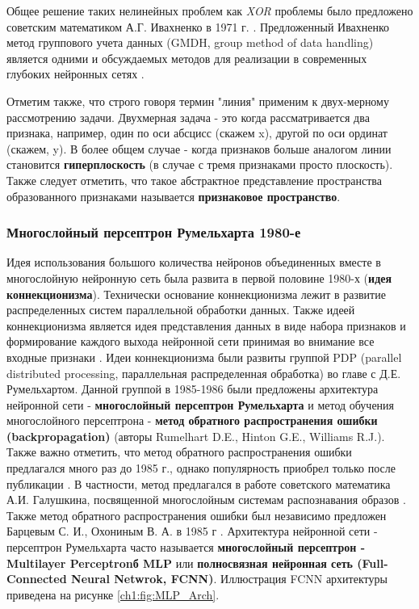 \documentclass[12pt]{article}
\begin{document}
\begin{sloppypar}
Общее решение таких нелинейных проблем как \emph{XOR} проблемы было предложено советским математиком А.Г. Ивахненко в 1971 г. 
\cite{ivakhnenko1971polynomial}. 
 Предложенный Ивахненко метод группового учета данных (GMDH, group method of data handling) является одними и обсуждаемых методов для реализации в современных глубоких нейронных сетях
\cite{schmidhuber2015deep, kelleher2019deep}. 

Отметим также, что строго говоря термин "линия" применим к двух-мерному рассмотрению задачи. 
Двухмерная задача - это когда рассматривается два признака, например, один по оси абсцисс (скажем x), другой по оси ординат (скажем, y). В более общем случае - когда признаков больше аналогом линии становится \textbf{гиперплоскость} (в случае с тремя признаками просто плоскость). Также следует отметить, что такое абстрактное представление пространства образованного признаками называется  \textbf{признаковое пространство}. 

\subsubsection{ Многослойный персептрон Румельхарта 1980-е}

Идея использования большого количества нейронов объединенных вместе в многослойную нейронную сеть была развита в первой половине 1980-х (\textbf{идея коннекционизма}). Технически основание коннекционизма лежит в развитие распределенных систем параллельной обработки данных. Также идеей коннекционизма является идея представления данных в виде набора признаков и формирование каждого выхода нейронной сети принимая во внимание все входные признаки 
\cite{goodfellow2016deep}. 
Идеи коннекционизма были развиты группой 
PDP (parallel distributed processing, параллельная распределенная обработка) во главе с Д.Е. Румельхартом. Данной группой в 1985-1986 были предложены архитектура нейронной сети - \textbf{многослойный персептрон  Румельхарта}
\cite{rummelhart1986parallel}
и метод обучения многослойного персептрона -\textbf{ метод обратного распространения ошибки (backpropagation)} 
\cite{rumelhart1985learning} (авторы Rumelhart D.E., Hinton G.E., Williams R.J.). Также важно отметить, что метод обратного распространения ошибки предлагался много раз до 1985 г., однако популярность приобрел только после публикации \cite{rumelhart1985learning}. В частности, метод предлагался в работе советского математика А.И. Галушкина, посвященной многослойным системам распознавания образов \cite{Galushkin1974synthesis}. Также метод обратного распространения ошибки был независимо предложен Барцевым С. И., Охониным В. А. в 1985 г \cite{Barcev1986adaptive}.  Архитектура нейронной сети - персептрон Румельхарта  часто называется \textbf{многослойный персептрон - Multilayer Perceptronб MLP} или \textbf{полносвязная нейронная сеть (Full-Connected Neural Netwrok, FCNN)}. Иллюстрация FCNN архитектуры приведена на рисунке \ref{ch1:fig:MLP_Arch}.


\end{sloppypar}
\end{document}
